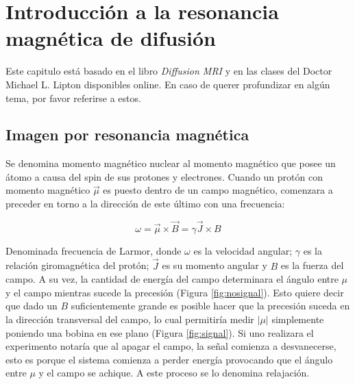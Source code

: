 \chapter{Introducci\'on a la resonancia magn\'etica de difusi\'on}

Este capitulo est\'a basado en el libro \textit{Diffusion MRI} \cite{Basser2009}
y en las clases del Doctor Michael L. Lipton \cite{Lipton2014} disponibles online. 
En caso de querer profundizar en alg\'un tema, por favor referirse a estos. 

\section{Imagen por resonancia magnética}
Se denomina momento magn\'etico nuclear al momento magn\'etico que posee un 
\'atomo a causa del spin de sus protones y electrones. Cuando un prot\'on con 
momento magn\'etico $\vec{\mu}$ es puesto dentro de un campo magn\'etico, 
comenzara a preceder en torno a la direcci\'on de este \'ultimo con una 
frecuencia: 

$$ \omega = \vec{\mu} \times \vec{B} = \gamma \vec{J} \times B $$

Denominada frecuencia de Larmor, donde $\omega$ es la velocidad angular; $\gamma$ es
la relaci\'on giromagn\'etica del prot\'on; $\vec{J}$ es su momento angular y $B$
es la fuerza del campo. A su vez, la cantidad de energ\'ia del campo determinara
el \'angulo entre $\mu$ y el campo mientras sucede la precesi\'on
(Figura \ref{fig:nosignal}). Esto quiere decir que dado un $B$ suficientemente 
grande es posible hacer que la precesi\'on suceda en la direcci\'on transversal
del campo, lo cual permitir\'ia medir $|\mu|$ simplemente poniendo una bobina en
ese plano (Figura \ref{fig:signal}). Si uno realizara el experimento notar\'ia
que al apagar el campo, la se\~nal comienza a desvanecerse, esto es porque el
sistema comienza a perder energ\'ia provocando que el \'angulo entre $\mu$ y el
campo se achique. A este proceso se lo denomina relajaci\'on. \\

